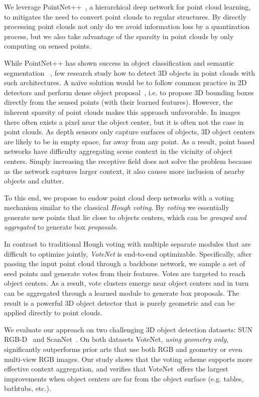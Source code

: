\documentclass[10pt,twocolumn,letterpaper]{article}
\newcommand\votenet{VoteNet}
\begin{document}
We leverage PointNet++~\cite{qi2017pointnetplusplus}, a hierarchical deep network for point cloud learning, to mitigates the need to convert point clouds to regular structures. By directly processing point clouds not only do we avoid information loss by a quantization process, but we also take advantage of the sparsity in point clouds by only computing on sensed points.

While PointNet++ has shown success in object classification and semantic segmentation ~\cite{qi2017pointnetplusplus}, few research study how to detect 3D objects in point clouds with such architectures.
A na\"ive solution would be to follow common practice in 2D detectors and perform dense object proposal~\cite{liu2016ssd,ren2015faster}, i.e. to propose 3D bounding boxes directly from the sensed points (with their learned features). However, the inherent sparsity of point clouds makes this approach unfavorable. In images there often exists a pixel near the object center, but it is often not the case in point clouds. As depth sensors only capture surfaces of objects, 3D object centers are likely to be in empty space, far away from any point. As a result, point based networks have difficulty aggregating scene context in the vicinity of object centers. Simply increasing the receptive field does not solve the problem because as the network captures larger context, it also causes more inclusion of nearby objects and clutter.


To this end, we propose to endow point cloud deep networks with a voting mechanism similar to the classical \emph{Hough voting}.  
By \emph{voting} we essentially generate new points that lie close to objects centers, which can be \textit{grouped and aggregated} to generate box \textit{proposals}. 



In contrast to traditional Hough voting with multiple separate modules that are difficult to optimize jointly, \emph{\votenet{}} is end-to-end optimizable. Specifically, after passing the input point cloud through a backbone network, we sample a set of seed points and generate votes from their features. Votes are targeted to reach object centers. As a result, vote clusters emerge near object centers and in turn can be aggregated through a learned module to generate box proposals. The result is a powerful 3D object detector that is purely geometric and can be applied directly to point clouds.



We evaluate our approach on two challenging 3D object detection datasets: SUN RGB-D~\cite{song2015sun} and ScanNet~\cite{dai2017scannet}. On both datasets \votenet{}, \emph{using geometry only}, significantly outperforms prior arts that use both RGB and geometry or even multi-view RGB images.
Our study shows that the voting scheme supports more effective context aggregation, and verifies that \votenet{}~offers the largest improvements when object centers are far from the object surface (e.g. tables, bathtubs, etc.).
\end{document}
